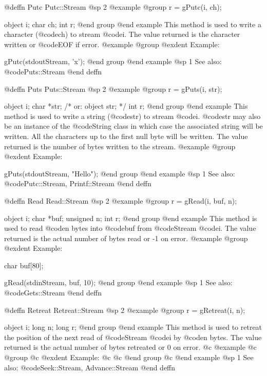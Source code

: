 @deffn {Putc} Putc::Stream
@sp 2
@example
@group
r = gPutc(i, ch);

object  i;
char    ch;
int     r;
@end group
@end example
This method is used to write a character (@code{ch}) to stream @code{i}.
The value returned is the character written or @code{EOF} if error.
@example
@group
@exdent Example:
 
gPutc(stdoutStream, 'x');
@end group
@end example
@sp 1
See also:  @code{Puts::Stream}
@end deffn










@deffn {Puts} Puts::Stream
@sp 2
@example
@group
r = gPuts(i, str);

object  i;
char    *str;  /*  or:  object str;  */
int     r;
@end group
@end example
This method is used to write a string (@code{str}) to stream @code{i}.
@code{str} may also be an instance of the @code{String} class in which
case the associated string will be written.  All the characters up to
the first null byte will be written.  The value returned is the number
of bytes written to the stream.
@example
@group
@exdent Example:
 
gPuts(stdoutStream, "Hello\n");
@end group
@end example
@sp 1
See also:  @code{Putc::Stream, Printf::Stream}
@end deffn










@deffn {Read} Read::Stream
@sp 2
@example
@group
r = gRead(i, buf, n);

object  i;
char    *buf;
unsigned n;
int     r;
@end group
@end example
This method is used to read @code{n} bytes into @code{buf} from
@code{Stream} @code{i}.  The value returned is the actual number
of bytes read or -1 on error.
@example
@group
@exdent Example:
 
char    buf[80];

gRead(stdinStream, buf, 10);
@end group
@end example
@sp 1
See also:  @code{Gets::Stream}
@end deffn











@deffn {Retreat} Retreat::Stream
@sp 2
@example
@group
r = gRetreat(i, n);

object  i;
long    n;
long    r;
@end group
@end example
This method is used to retreat the position of the next
read of @code{Stream} @code{i} by @code{n} bytes.
The value returned is the actual number of bytes retreated or
0 on error.
@c @example
@c @group
@c @exdent Example:
@c  
@c @end group
@c @end example
@sp 1
See also:  @code{Seek::Stream, Advance::Stream}
@end deffn

















